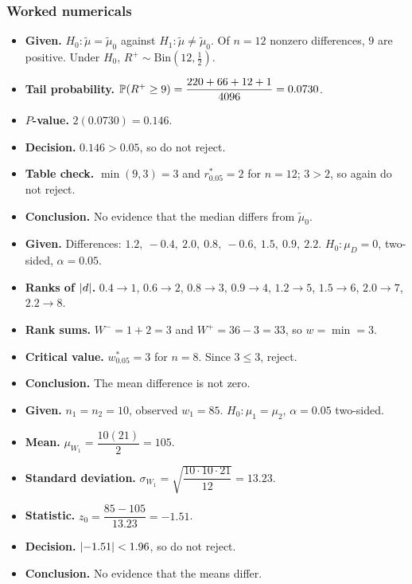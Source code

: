 \subsubsection*{Worked numericals}

\begin{example}
\begin{itemize}
  \item \textbf{Given.} $H_0:\tilde\mu=\tilde\mu_0$ against $H_1:\tilde\mu\ne\tilde\mu_0$. Of $n=12$ nonzero differences, $9$ are positive. Under $H_0$, $R^+\sim\mathrm{Bin}(12,\tfrac12)$.
  \item \textbf{Tail probability.} $\mathbb{P}(R^+\ge9)=\dfrac{220+66+12+1}{4096}=0.0730$.
  \item \textbf{$P$-value.} $2(0.0730)=0.146$.
  \item \textbf{Decision.} $0.146>0.05$, so do not reject.
  \item \textbf{Table check.} $\min(9,3)=3$ and $r^*_{0.05}=2$ for $n=12$; $3>2$, so again do not reject.
  \item \textbf{Conclusion.} No evidence that the median differs from $\tilde\mu_0$.
\end{itemize}
\end{example}

\begin{example}
\begin{itemize}
  \item \textbf{Given.} Differences: $1.2,\ -0.4,\ 2.0,\ 0.8,\ -0.6,\ 1.5,\ 0.9,\ 2.2$. $H_0:\mu_D=0$, two-sided, $\alpha=0.05$.
  \item \textbf{Ranks of $\lvert d\rvert$.} $0.4\to1$, $0.6\to2$, $0.8\to3$, $0.9\to4$, $1.2\to5$, $1.5\to6$, $2.0\to7$, $2.2\to8$.
  \item \textbf{Rank sums.} $W^-=1+2=3$ and $W^+=36-3=33$, so $w=\min=3$.
  \item \textbf{Critical value.} $w^*_{0.05}=3$ for $n=8$. Since $3\le3$, reject.
  \item \textbf{Conclusion.} The mean difference is not zero.
\end{itemize}
\end{example}

\begin{example}
\begin{itemize}
  \item \textbf{Given.} $n_1=n_2=10$, observed $w_1=85$. $H_0:\mu_1=\mu_2$, $\alpha=0.05$ two-sided.
  \item \textbf{Mean.} $\mu_{W_1}=\dfrac{10(21)}{2}=105$.
  \item \textbf{Standard deviation.} $\sigma_{W_1}=\sqrt{\dfrac{10\cdot10\cdot21}{12}}=13.23$.
  \item \textbf{Statistic.} $z_0=\dfrac{85-105}{13.23}=-1.51$.
  \item \textbf{Decision.} $\lvert-1.51\rvert<1.96$, so do not reject.
  \item \textbf{Conclusion.} No evidence that the means differ.
\end{itemize}
\end{example}

